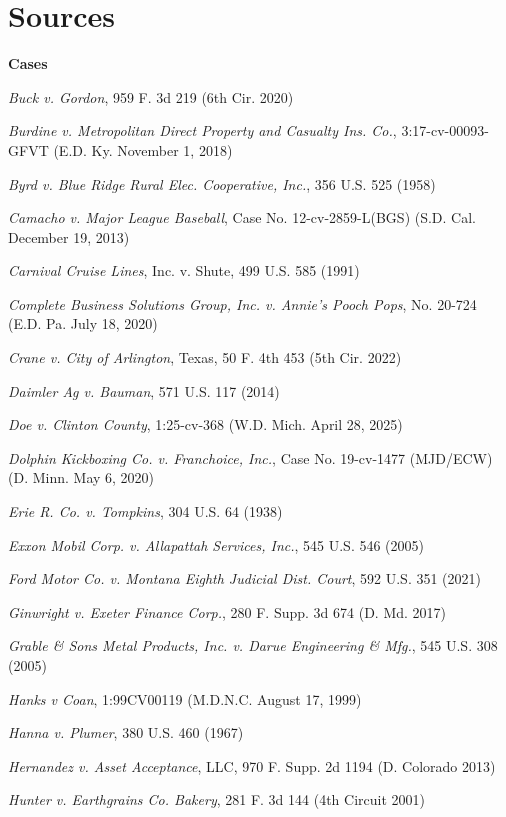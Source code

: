 \pagestyle{plain.scrheadings}

\chapter*{Sources}

{\bfseries\Large{Cases}}

\textit{Buck v. Gordon}, 959 F. 3d 219 (6th Cir. 2020)

\textit{Burdine v. Metropolitan Direct Property and Casualty Ins. Co.}, 3:17-cv-00093-GFVT (E.D. Ky. November 1, 2018)

\textit{Byrd v. Blue Ridge Rural Elec. Cooperative, Inc.}, 356 U.S. 525 (1958)

\textit{Camacho v. Major League Baseball}, Case No. 12-cv-2859-L(BGS) (S.D. Cal. December 19, 2013)

\textit{Carnival Cruise Lines}, Inc. v. Shute, 499 U.S. 585 (1991)

\textit{Complete Business Solutions Group, Inc. v. Annie’s Pooch Pops}, No. 20-724 (E.D. Pa. July 18, 2020)

\textit{Crane v. City of Arlington}, Texas, 50 F. 4th 453 (5th Cir. 2022)

\textit{Daimler Ag v. Bauman}, 571 U.S. 117 (2014)

\textit{Doe v. Clinton County}, 1:25-cv-368 (W.D. Mich. April 28, 2025)

\textit{Dolphin Kickboxing Co. v. Franchoice, Inc.}, Case No. 19-cv-1477 (MJD/ECW) (D. Minn. May 6, 2020)

\textit{Erie R. Co. v. Tompkins}, 304 U.S. 64 (1938)

\textit{Exxon Mobil Corp. v. Allapattah Services, Inc.}, 545 U.S. 546 (2005)

\textit{Ford Motor Co. v. Montana Eighth Judicial Dist. Court}, 592 U.S. 351 (2021)

\textit{Ginwright v. Exeter Finance Corp.}, 280 F. Supp. 3d 674 (D. Md. 2017)

\textit{Grable \& Sons Metal Products, Inc. v. Darue Engineering \& Mfg.}, 545 U.S. 308 (2005)

\textit{Hanks v Coan}, 1:99CV00119 (M.D.N.C. August 17, 1999)

\textit{Hanna v. Plumer}, 380 U.S. 460 (1967)

\textit{Hernandez v. Asset Acceptance}, LLC, 970 F. Supp. 2d 1194 (D. Colorado 2013)

\textit{Hunter v. Earthgrains Co. Bakery}, 281 F. 3d 144 (4th Circuit 2001)

